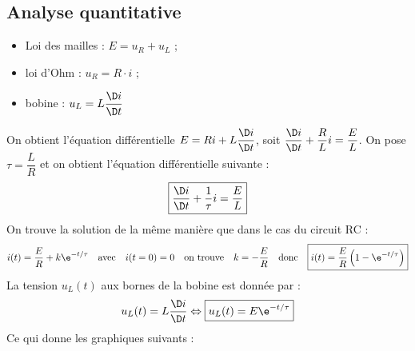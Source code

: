 \documentclass{cours}
\begin{document}
\subsection{Analyse quantitative}
\begin{itemize}
\item Loi des mailles : $E=u_R+u_L$ ;
\item loi d'Ohm : $u_R=R\cdot i$ ;
\item bobine : $u_L=L \dfrac{\D i}{\D t}$
\end{itemize}
On obtient l'équation différentielle $E=Ri+L \dfrac{\D i }{\D t}$, soit $\dfrac{\D i }{\D t}+\dfrac{R}{L}i=\dfrac{E}{L}$. On pose $\tau=\dfrac{L}{R}$ et on obtient l'équation différentielle suivante :
\begin{equation*}
\boxed{
  \frac{\D i}{\D t}+\frac{1}{\tau}i = \frac{E}{L}
}
\end{equation*}
On trouve la solution de la même manière que dans le cas du circuit RC : 
\begin{equation*}
i(t) = \frac{E}{R} + k\e^{-t/\tau} \quad \text{avec} \quad i(t=0)=0 \quad \text{on trouve} \quad k=-\frac{E}{R} \quad \text{donc} \quad \boxed{i(t)=\frac{E}{R}\left( 1-\e^{-t/\tau} \right)}
\end{equation*}
La tension $u_L(t)$ aux bornes de la bobine est donnée par :
\begin{equation*}
u_L(t)=L \frac{\D i}{\D t} \Leftrightarrow \boxed{u_L(t)=E\e^{-t/\tau}}
\end{equation*}
Ce qui donne les graphiques suivants :
\end{document}
